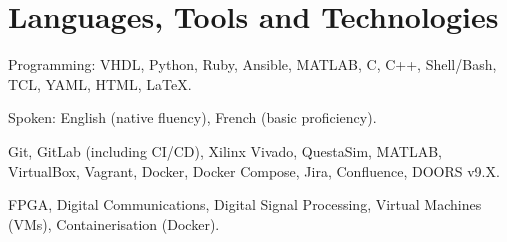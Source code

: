 %
%
\sectionsep
\section{Languages, Tools and Technologies}
\descript{ }
Programming: \hspace{0.5em} VHDL, Python, Ruby, Ansible, MATLAB, C, C++, Shell/Bash, TCL, YAML, HTML, \LaTeX.

Spoken: \hspace{3em} English (native fluency), French (basic proficiency).

\sectionsep

\descript{ }
Git, GitLab (including CI/CD), Xilinx Vivado, QuestaSim, MATLAB, VirtualBox, Vagrant, Docker, Docker Compose, Jira, Confluence, DOORS v9.X.

\sectionsep

\descript{ }
FPGA, Digital Communications, Digital Signal Processing, Virtual Machines (VMs), Containerisation (Docker).

\sectionsep